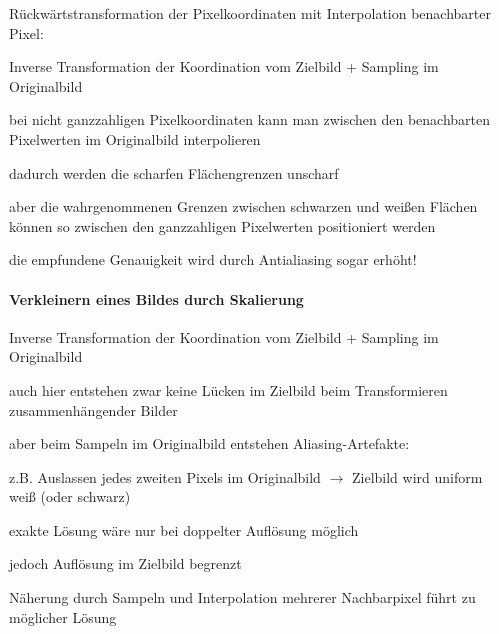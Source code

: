 \documentclass[landscape]{article}
\begin{document}
\begin{multicols}{3}
  Rückwärtstransformation der Pixelkoordinaten mit Interpolation benachbarter Pixel:
  \begin{itemize*}
    \item Inverse Transformation der Koordination vom Zielbild + Sampling im Originalbild
    \item bei nicht ganzzahligen Pixelkoordinaten kann man zwischen den benachbarten Pixelwerten im Originalbild interpolieren
    \item dadurch werden die scharfen Flächengrenzen unscharf
    \item aber die wahrgenommenen Grenzen zwischen schwarzen und weißen Flächen können so zwischen den ganzzahligen Pixelwerten positioniert werden
    \item die empfundene Genauigkeit wird durch Antialiasing sogar erhöht!
  \end{itemize*}
  
  \paragraph{Verkleinern eines Bildes durch Skalierung}
  \begin{itemize*}
    \item Inverse Transformation der Koordination vom Zielbild + Sampling im Originalbild
    \begin{itemize*}
      \item auch hier entstehen zwar keine Lücken im Zielbild beim Transformieren zusammenhängender Bilder
      \item aber beim Sampeln im Originalbild entstehen Aliasing-Artefakte:
      \item z.B. Auslassen jedes zweiten Pixels im Originalbild $\rightarrow$ Zielbild wird uniform weiß (oder schwarz)
    \end{itemize*}
    \item exakte Lösung wäre nur bei doppelter Auflösung möglich
    \item jedoch Auflösung im Zielbild begrenzt
    \item Näherung durch Sampeln und Interpolation mehrerer Nachbarpixel führt zu möglicher Lösung
  \end{itemize*}
  

\end{multicols}
\end{document}
